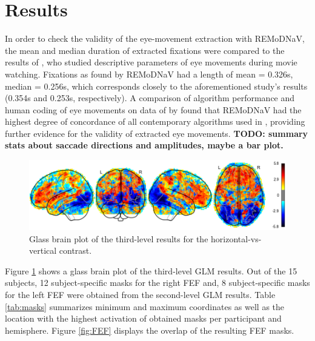 \documentclass[a4paper, 12pt]{scrreprt}
\begin{document}
\section{Results}

In order to check the validity of the eye-movement extraction with REMoDNaV, the mean and median duration of extracted fixations were compared to the results of \textcite{dorr2010variability}, who studied descriptive parameters of eye movements during movie watching. Fixations as found by REMoDNaV had a length of mean = 0.326s, median = 0.256s, which corresponds closely to the aforementioned study's results (0.354s and 0.253s, respectively). A comparison of algorithm performance and human coding of eye movements on data of \textcite{andersson2017one} by \textcite{dar2019} found that REMoDNaV had the highest degree of concordance of all contemporary algorithms used in \textcite{anderson2015comparison}, providing further evidence for the validity of extracted eye movements. \newline
\textbf{TODO: summary stats about saccade directions and amplitudes, maybe a bar plot.}

\begin{figure}[h]
	\includegraphics[scale=0.6]{img/3rdlvl_fitlins.png}
	\caption[GLM results with fitlins]{\small{Glass brain plot of the third-level results for the horizontal-vs-vertical contrast.}}
	\label{fig:fitlins}
\end{figure}

Figure \ref{fig:fitlins} shows a glass brain plot of the third-level GLM results. Out of the 15 subjects, 12 subject-specific masks for the right FEF and, 8 subject-specific masks for the left FEF were obtained from the second-level GLM results. Table \ref{tab:masks} summarizes minimum and maximum coordinates as well as the location with the highest activation of obtained masks per participant and hemisphere. Figure \ref{fig:FEF} displays the overlap of the resulting FEF masks.
\end{document}
